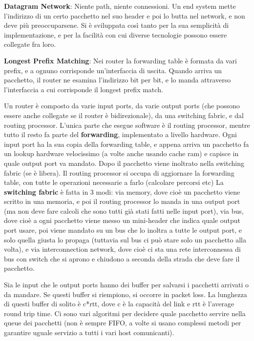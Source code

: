\documentclass[a4paper,10pt]{article} %
\renewcommand{\b}[1]{%
    {\textbf{#1}}}
\begin{document}
\b{Datagram Network}: Niente path, niente connessioni. Un end system mette l'indirizzo di un certo pacchetto nel suo header e poi lo butta nel network, e non deve più preoccuparsene. Si è sviluppata così tanto per la sua semplicità di implementazione, e per la facilità con cui diverse tecnologie possono essere collegate fra loro.

\b{Longest Prefix Matching}: Nei router la forwarding table è formata da vari prefix, e a ognuno corrisponde un'interfaccia di uscita. Quando arriva un pacchetto, il router ne esamina l'indirizzo bit per bit, e lo manda attraverso l'interfaccia a cui corrisponde il longest prefix match.

Un router è composto da varie input ports, da varie output ports (che possono essere anche collegate se il router è bidirezionale), da una switching fabric, e dal routing processor. L'unica parte che esegue software è il routing processor, mentre tutto il resto fa parte del \b{forwarding}, implementato a livello hardware. Ogni input port ha la sua copia della forwarding table, e appena arriva un pacchetto fa un lookup hardware velocissimo (a volte anche usando cache ram) e capisce in quale output port va mandato. Dopo il pacchetto viene inoltrato nella switching fabric (se è libera). Il routing processor si occupa di aggiornare la forwarding table, con tutte le operazioni necessarie a farlo (calcolare percorsi etc)
La \b{switching fabric} è fatta in 3 modi: via memory, dove cioè un pacchetto viene scritto in una memoria, e poi il routing processor lo manda in una output port (ma non deve fare calcoli che sono tutti già stati fatti nelle input port), via bus, dove cioè a ogni pacchetto viene messo un mini-header che indica quale output port usare, poi viene mandato su un bus che lo inoltra a tutte le output port, e solo quella giusta lo propaga (tuttavia sul bus ci può stare solo un pacchetto alla volta), e via interconnection network, dove cioè ci sta una rete interconnessa di bus con switch che si aprono e chiudono a seconda della strada che deve fare il pacchetto.

Sia le input che le output ports hanno dei buffer per salvarsi i pacchetti arrivati o da mandare. Se questi buffer si riempiono, si occorre in packet loss. La lunghezza di questi buffer di solito è c*rtt, dove c è la capacità del link e rtt è l'average round trip time. Ci sono vari algoritmi per decidere quale pacchetto servire nella queue dei pacchetti (non è sempre FIFO, a volte si usano complessi metodi per garantire uguale servizio a tutti i vari host comunicanti).
\end{document}
